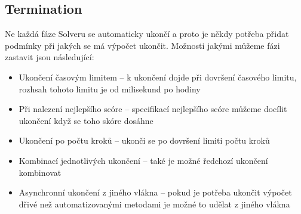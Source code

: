 \subsection{Termination}
Ne každá fáze Solveru se automaticky ukončí a proto je někdy potřeba přidat podmínky při jakých se má výpočet ukončit. Možnosti jakými můžeme fázi zastavit jsou následující:
\begin{itemize}
\item Ukončení časovým limitem -- k ukončení dojde při dovršení časového limitu, rozhsah tohoto limitu je od milisekund po hodiny
\item Při nalezení nejlepšího scóre -- specifikací nejlepšího scóre můžeme docílit ukončení když se toho skóre dosáhne
\item Ukončení po počtu kroků -- ukonči se po dovršení limiti počtu kroků
\item Kombinací jednotlivých ukončení -- také je možné ředchozí ukončení kombinovat
\item Asynchronní ukončení z jiného vlákna -- pokud je potřeba ukončit výpočet dřivé než automatizovanými metodami je možné to udělat z jiného vlákna
\end{itemize}


